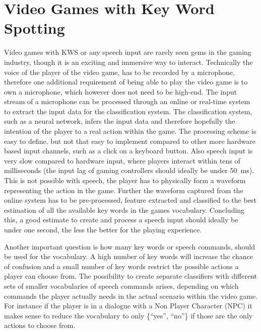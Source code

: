 
\section{Video Games with Key Word Spotting}\label{sec:intro_games}
\thesisStateReady
Video games with KWS or any speech input are rarely seen gems in the gaming industry, though it is an exciting and immersive way to interact.
Technically the voice of the player of the video game, has to be recorded by a microphone, therefore one additional requirement of being able to play the video game is to own a microphone, which however does not need to be high-end.
The input stream of a microphone can be processed through an online or real-time system to extract the input data for the classification system.
The classification system, such as a neural network, infers the input data and therefore hopefully the intention of the player to a real action within the game.
The processing scheme is easy to define, but not that easy to implement compared to other more hardware based input channels, such as a click on a keyboard button.
Also speech input is very slow compared to hardware input, where players interact within tens of milliseconds (the input lag of gaming controllers should ideally be under \SI{50}{\milli\second}).
This is not possible with speech, the player has to physically form a waveform representing the action in the game.
Further the waveform captured from the online system has to be pre-processed, feature extracted and classified to the best estimation of all the available key words in the games vocabulary.
Concluding this, a good estimate to create and process a speech input should ideally be under one second, the less the better for the playing experience.

Another important question is how many key words or speech commands, should be used for the vocabulary.
A high number of key words will increase the chance of confusion and a small number of key words restrict the possible actions a player can choose from.
The possibility to create separate classifiers with different sets of smaller vocabularies of speech commands arises, depending on which commands the player actually needs in the actual scenario within the video game. 
For instance if the player is in a dialogue with a Non Player Character (NPC) it makes sense to reduce the vocabulary to only \{\enquote{yes}, \enquote{no}\} if those are the only actions to choose from.

